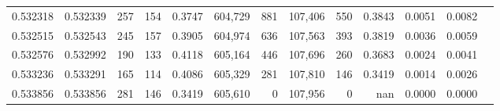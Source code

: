 \begin{tabular}{rrrrrrrrrrrrr}
0.532318 & 0.532339 &   257 &   154 &                                     0.3747 & 604,729 &     881 & 107,406 &     550 & 0.3843 & 0.0051 & 0.0082 \\
0.532515 & 0.532543 &   245 &   157 &                                     0.3905 & 604,974 &     636 & 107,563 &     393 & 0.3819 & 0.0036 & 0.0059 \\
0.532576 & 0.532992 &   190 &   133 &                                     0.4118 & 605,164 &     446 & 107,696 &     260 & 0.3683 & 0.0024 & 0.0041 \\
0.533236 & 0.533291 &   165 &   114 &                                     0.4086 & 605,329 &     281 & 107,810 &     146 & 0.3419 & 0.0014 & 0.0026 \\
0.533856 & 0.533856 &   281 &   146 &                                     0.3419 & 605,610 &       0 & 107,956 &       0 &    nan & 0.0000 & 0.0000 \\
\bottomrule
\end{tabular}
